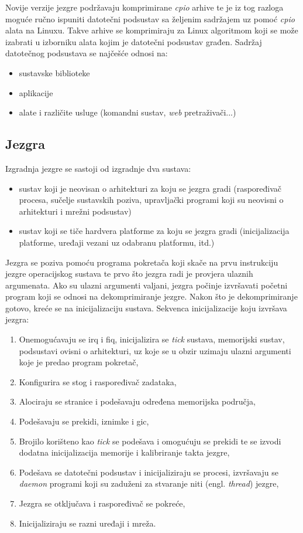\documentclass[times, utf8, diplomski, numeric]{fer}
\begin{document}
Novije verzije jezgre podržavaju komprimirane \textit{cpio} arhive te je iz tog razloga moguće ručno ispuniti datotečni
podsustav sa željenim sadržajem uz pomoć \textit{cpio} alata na Linuxu. Takve arhive se komprimiraju za Linux algoritmom
koji se može izabrati u izborniku alata kojim je datotečni podsustav građen.
Sadržaj datotečnog podsustava se najčešće odnosi na:
\begin{itemize}
  \item{sustavske biblioteke}
  \item{aplikacije}
  \item{alate i različite usluge (komandni sustav, \textit{web} pretraživači...)}
\end{itemize}

\newpage
\subsection{Jezgra}
Izgradnja jezgre se sastoji od izgradnje dva sustava:
\begin{itemize}
  \item{sustav koji je neovisan o arhitekturi za koju se jezgra gradi (raspoređivač procesa, sučelje sustavskih poziva,
  upravljački programi koji su neovisni o arhitekturi i mrežni podsustav)}
  \item{sustav koji se tiče hardvera platforme za koju se jezgra gradi (inicijalizacija platforme, uređaji vezani uz odabranu
  platformu, itd.)}
\end{itemize}
Jezgra se poziva pomoću programa pokretača koji skače na prvu instrukciju jezgre operacijskog sustava te prvo što jezgra radi je
provjera ulaznih argumenata. Ako su ulazni argumenti valjani, jezgra počinje izvršavati početni program koji se odnosi na
dekomprimiranje jezgre. Nakon što je dekomprimiranje gotovo, kreće se na inicijalizaciju sustava. Sekvenca inicijalizacije
koju izvršava jezgra:
\begin{enumerate}
  \item{Onemogućavaju se \gls{irq} i \gls{fiq}, inicijalizira se \textit{tick} sustava, memorijski sustav, podsustavi ovisni o arhitekturi,
  uz koje se u obzir uzimaju ulazni argumenti koje je predao program pokretač,}
  \item{Konfigurira se stog i raspoređivač zadataka,}
  \item{Alociraju se stranice i podešavaju određena memorijska područja,}
  \item{Podešavaju se prekidi, iznimke i \gls{gic},}
  \item{Brojilo korišteno kao \textit{tick} se podešava i omogućuju se prekidi te se izvodi dodatna inicijalizacija memorije i
  kalibriranje takta jezgre,}
  \item{Podešava se datotečni podsustav i inicijaliziraju se procesi, izvršavaju se \textit{daemon} programi koji su zaduženi
  za stvaranje niti (engl. \textit{thread}) jezgre,}
  \item{Jezgra se otključava i raspoređivač se pokreće,}
  \item{Inicijaliziraju se razni uređaji i mreža.}
\end{enumerate}
\end{document}
